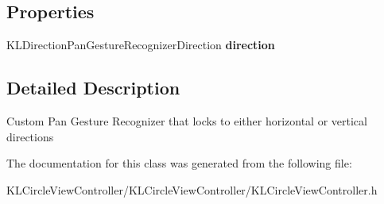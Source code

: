 \subsection*{Properties}
\begin{DoxyCompactItemize}
\item 
\hypertarget{interface_k_l_direction_pan_gesture_recognizer_abd1fdfcc9d2ee0a0ada12315f11638e7}{K\-L\-Direction\-Pan\-Gesture\-Recognizer\-Direction {\bfseries direction}}\label{interface_k_l_direction_pan_gesture_recognizer_abd1fdfcc9d2ee0a0ada12315f11638e7}

\end{DoxyCompactItemize}


\subsection{Detailed Description}
Custom Pan Gesture Recognizer that locks to either horizontal or vertical directions 

The documentation for this class was generated from the following file\-:\begin{DoxyCompactItemize}
\item 
K\-L\-Circle\-View\-Controller/\-K\-L\-Circle\-View\-Controller/K\-L\-Circle\-View\-Controller.\-h\end{DoxyCompactItemize}
